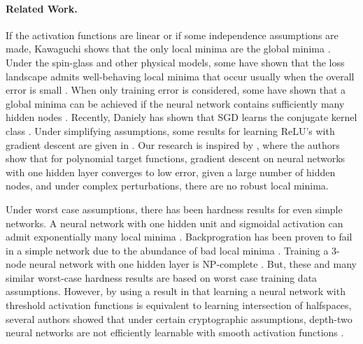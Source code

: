 
\paragraph{Related Work.}
If the activation functions are linear or
if some independence assumptions are made, Kawaguchi shows that the
only local minima are the global minima \cite{Kawaguchi16a}. Under the
spin-glass and other physical models, some have shown that the loss
landscape admits well-behaving local minima that occur usually when the
overall error is small
\cite{ChoromanskaHMAL14, DauphinPGCGB14}. When only training
error is considered, some have shown that a global minima can be
achieved if the neural network contains sufficiently many hidden nodes
\cite{SoudryC16}. Recently, Daniely has shown that SGD learns the conjugate kernel class \cite{daniely2017sgd}. Under simplifying assumptions, some results for learning ReLU's with gradient descent are given in \cite{tian2017analytical, brutzkus2017globally}. Our research is inspired by
\cite{valiant2014learning}, where the authors show that for polynomial 
target functions, gradient descent on neural networks
with one hidden layer converges to low error, given a large
number of hidden nodes, and under complex perturbations,
there are no robust local minima.

Under worst case assumptions, there has been hardness results for even simple networks. A neural network with one hidden unit and sigmoidal activation can admit exponentially many local minima \cite{Auer}. Backprogration has been proven to fail in a simple network due to the abundance of bad local minima \cite{brady1989back}. Training a 3-node neural network with one hidden layer is { NP}-complete \cite{BlumR88}.  But, these and many similar worst-case hardness results are based on worst case training data assumptions. However, by using a result in \cite{klivans2006cryptographic} that learning a neural network with threshold activation functions is equivalent to learning intersection of halfspaces, several authors showed that under certain cryptographic assumptions, depth-two neural networks are not efficiently learnable with smooth activation functions \cite{LivniSS14, ZhangLWJ15, ZhangLJ15}.


